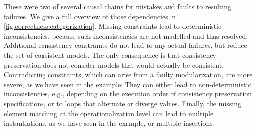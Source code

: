 These were two of several causal chains for mistakes and faults to resulting failures.
We give a full overview of those dependencies in \autoref{fig:correctness:categorization}.
Missing constraints lead to deterministic inconsistencies, because such inconsistencies are not modelled and thus resolved.
Additional consistency constraints do not lead to any actual failures, but reduce the set of consistent models. 
The only consequence is that consistency preservation does not consider models that would actually be consistent.
Contradicting constraints, which can arise from a faulty modularization, are more severe, as we have seen in the example:
They can either lead to non-deterministic inconsistencies, e.g., depending on the execution order of consistency preservation specifications, or to loops that alternate or diverge values.
Finally, the missing element matching at the operationalization level can lead to multiple instantiations, as we have seen in the example, or multiple insertions. %



